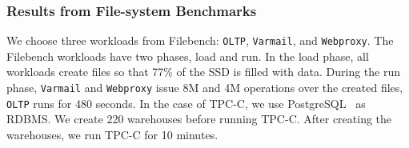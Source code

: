 \subsubsection{Results from File-system Benchmarks}
\label{sec:exp:fs}
We choose three workloads from Filebench: \texttt{OLTP}, \texttt{Varmail}, and
\texttt{Webproxy}. The Filebench workloads have two phases, load and run.  In
the load phase, all workloads create files so that 77\% of the SSD is filled
with data. During the run phase, \texttt{Varmail} and \texttt{Webproxy} issue
8M and 4M operations over the created files, \texttt{OLTP} runs for 480
seconds.  In the case of TPC-C, we use PostgreSQL~\cite{postgresql} as RDBMS.
We create 220 warehouses before running TPC-C.  After creating the warehouses,
we run TPC-C for 10 minutes.

